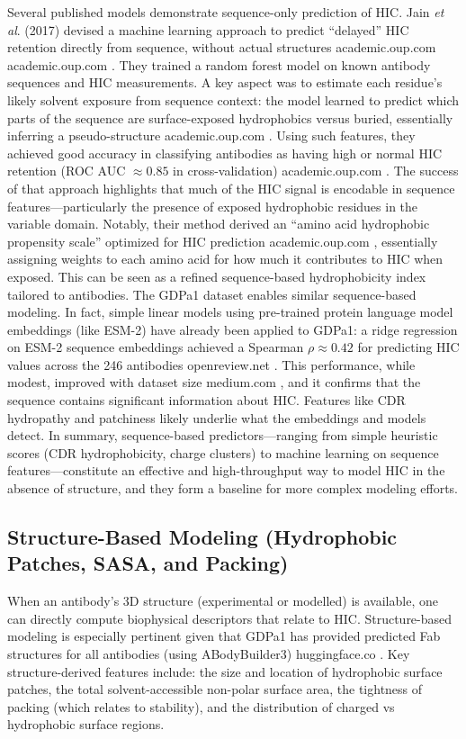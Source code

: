 \documentclass[12pt]{article}
\begin{document}
Several published models demonstrate sequence-only prediction of HIC. Jain \textit{et al}. (2017) devised a machine learning approach to predict “delayed” HIC retention directly from sequence, without actual structures
academic.oup.com
academic.oup.com
. They trained a random forest model on known antibody sequences and HIC measurements. A key aspect was to estimate each residue’s likely solvent exposure from sequence context: the model learned to predict which parts of the sequence are surface-exposed hydrophobics versus buried, essentially inferring a pseudo-structure
academic.oup.com
. Using such features, they achieved good accuracy in classifying antibodies as having high or normal HIC retention (ROC AUC $\approx0.85$ in cross-validation)
academic.oup.com
. The success of that approach highlights that much of the HIC signal is encodable in sequence features—particularly the presence of exposed hydrophobic residues in the variable domain. Notably, their method derived an “amino acid hydrophobic propensity scale” optimized for HIC prediction
academic.oup.com
, essentially assigning weights to each amino acid for how much it contributes to HIC when exposed. This can be seen as a refined sequence-based hydrophobicity index tailored to antibodies. The GDPa1 dataset enables similar sequence-based modeling. In fact, simple linear models using pre-trained protein language model embeddings (like ESM-2) have already been applied to GDPa1: a ridge regression on ESM-2 sequence embeddings achieved a Spearman $\rho\approx0.42$ for predicting HIC values across the 246 antibodies
openreview.net
. This performance, while modest, improved with dataset size
medium.com
, and it confirms that the sequence contains significant information about HIC. Features like CDR hydropathy and patchiness likely underlie what the embeddings and models detect. In summary, sequence-based predictors—ranging from simple heuristic scores (CDR hydrophobicity, charge clusters) to machine learning on sequence features—constitute an effective and high-throughput way to model HIC in the absence of structure, and they form a baseline for more complex modeling efforts.

\subsection{Structure-Based Modeling (Hydrophobic Patches, SASA, and Packing)}
When an antibody’s 3D structure (experimental or modelled) is available, one can directly compute biophysical descriptors that relate to HIC. Structure-based modeling is especially pertinent given that GDPa1 has provided predicted Fab structures for all antibodies (using ABodyBuilder3)
huggingface.co
. Key structure-derived features include: the size and location of hydrophobic surface patches, the total solvent-accessible non-polar surface area, the tightness of packing (which relates to stability), and the distribution of charged vs hydrophobic surface regions.
\end{document}
